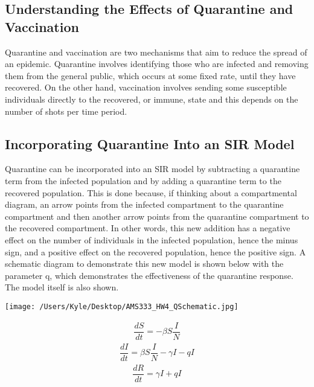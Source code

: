 \documentclass[12pt]{article}
\begin{document}
\subsection*{Understanding the Effects of Quarantine and Vaccination}

Quarantine and vaccination are two mechanisms that aim to reduce the spread of an epidemic. Quarantine involves identifying those who are infected and removing them from the general public, which occurs at some fixed rate, until they have recovered. On the other hand, vaccination involves sending some susceptible individuals directly to the recovered, or immune, state and this depends on the number of shots per time period. 


\subsection*{Incorporating Quarantine Into an SIR Model}

Quarantine can be incorporated into an SIR model by subtracting a quarantine term from the infected population and by adding a quarantine term to the recovered population. This is done because, if thinking about a compartmental diagram, an arrow points from the infected compartment to the quarantine compartment and then another arrow points from the quarantine compartment to the recovered compartment. In other words, this new addition has a negative effect on the number of individuals in the infected population, hence the minus sign, and a positive effect on the recovered population, hence the positive sign. A schematic diagram to demonstrate this new model is shown below with the parameter q, which demonstrates the effectiveness of the quarantine response. The model itself is also shown.
\begin{center}
   \texttt{[image: /Users/Kyle/Desktop/AMS333\_HW4\_QSchematic.jpg]}
\end{center}

\begin{gather*}
\dfrac{dS}{dt} = -{\beta}S\dfrac{I}{N}
\end{gather*}
\begin{gather*}
\dfrac{dI}{dt} = {\beta}S\dfrac{I}{N}-{\gamma}I-qI
\end{gather*}
\begin{gather*}
\dfrac{dR}{dt} = {\gamma}I+qI
\end{gather*}
\end{document}
